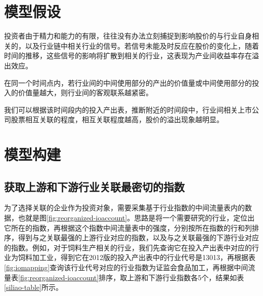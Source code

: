 \documentclass{sysuthesis}
\begin{document}
\section{模型假设}

投资者由于精力和能力的有限，往往没有办法立刻捕捉到影响股价的与行业自身相关的，以及行业链中相关行业的信号。若信号未能及时反应在股价的变化上，随着时间的推移，这些信号的影响将扩散到相关的行业，这表现为产业间收益率存在溢出效应。

在同一个时间点内，若行业间的中间使用部分的产出的价值量或中间使用部分的投入的价值量越大，则行业间的客观联系越紧密。

我们可以根据该时间段内的投入产出表，推断附近的时间段中，行业间相关上市公司股票相互关联的程度，相互关联程度越高，股价的溢出现象越明显。

\section{模型构建}

\subsection{获取上游和下游行业关联最密切的指数}

为了选择关联的企业作为投资对象，需要采集基于行业指数的中间流量表内的数据，也就是图\ref{fig:reorganized-ioaccount}。思路是将一个需要研究的行业，定位出它所在的指数，再根据这个指数中间流量表中的强度，分别按所在指数的行和列排序，得到与之关联最强的上游行业对应的指数，以及与之关联最强的下游行业对应的指数。例如，对于饲料生产相关的行业，我们先查询它在投入产出表中对应的行业为饲料加工业，得到它在2012版的投入产出表中的行业代号是13013，再根据表\ref{fig:iomapping}查询该行业代号对应的行业指数为证监会食品加工，再根据中间流量表\ref{fig:reorganized-ioaccount}排序，取上游和下游行业指数各5个，结果如表\ref{siliao-table}所示。
\end{document}
